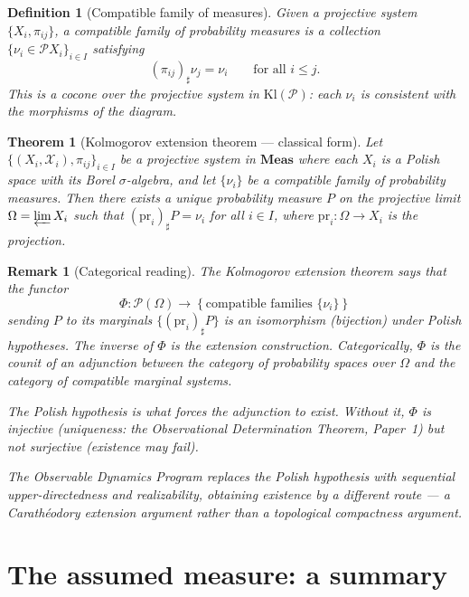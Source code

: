 \documentclass[11pt]{article}
\newtheorem{theorem}{Theorem}
\newtheorem{definition}{Definition}
\newtheorem{remark}{Remark}
\newcommand{\Meas}{\mathbf{Meas}}
\newcommand{\Kl}{\mathrm{Kl}}
\newcommand{\Pcal}{\mathcal{P}}
\newcommand{\Xcal}{\mathcal{X}}
\begin{document}
\begin{definition}[Compatible family of measures]
Given a projective system $\{X_i, \pi_{ij}\}$, a \emph{compatible family}
of probability measures is a collection $\{\nu_i \in \Pcal X_i\}_{i \in I}$
satisfying
\[
  (\pi_{ij})_\sharp \nu_j = \nu_i \qquad \text{for all } i \leq j.
\]
This is a \emph{cocone} over the projective system in $\Kl(\Pcal)$: each
$\nu_i$ is consistent with the morphisms of the diagram.
\end{definition}

\begin{theorem}[Kolmogorov extension theorem --- classical form]
\label{thm:kolmogorov}
Let $\{(X_i, \Xcal_i), \pi_{ij}\}_{i \in I}$ be a projective system in
$\Meas$ where each $X_i$ is a Polish space with its Borel $\sigma$-algebra,
and let $\{\nu_i\}$ be a compatible family of probability measures.  Then
there exists a unique probability measure $P$ on the projective limit
$\Omega = \varprojlim X_i$ such that $(\mathrm{pr}_i)_\sharp P = \nu_i$ for
all $i \in I$, where $\mathrm{pr}_i : \Omega \to X_i$ is the projection.
\end{theorem}

\begin{remark}[Categorical reading]
The Kolmogorov extension theorem says that the functor
\[
  \Phi : \Pcal(\Omega) \to \left\{\text{compatible families } \{\nu_i\}\right\}
\]
sending $P$ to its marginals $\{(\mathrm{pr}_i)_\sharp P\}$ is an
\emph{isomorphism} (bijection) under Polish hypotheses.  The inverse of $\Phi$
is the extension construction.  Categorically, $\Phi$ is the counit of an
adjunction between the category of probability spaces over $\Omega$ and the
category of compatible marginal systems.

The Polish hypothesis is what forces the adjunction to exist.  Without it,
$\Phi$ is injective (uniqueness: the Observational Determination Theorem,
Paper~1) but not surjective (existence may fail).

The Observable Dynamics Program replaces the Polish hypothesis with
\emph{sequential upper-directedness} and \emph{realizability}, obtaining
existence by a different route --- a Carathéodory extension argument rather
than a topological compactness argument.
\end{remark}

\section{The assumed measure: a summary}
\label{sec:summary}
\end{document}
